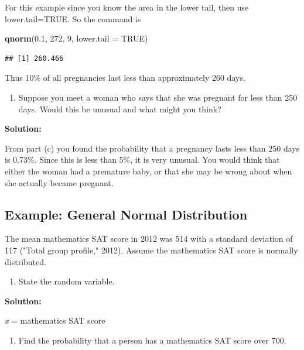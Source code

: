 \documentclass[
]{book}
\newenvironment{Shaded}{\begin{snugshade}}{\end{snugshade}}
\newcommand{\DataTypeTok}[1]{\textcolor[rgb]{0.13,0.29,0.53}{#1}}
\newcommand{\DecValTok}[1]{\textcolor[rgb]{0.00,0.00,0.81}{#1}}
\newcommand{\FloatTok}[1]{\textcolor[rgb]{0.00,0.00,0.81}{#1}}
\newcommand{\KeywordTok}[1]{\textcolor[rgb]{0.13,0.29,0.53}{\textbf{#1}}}
\newcommand{\NormalTok}[1]{#1}
\newcommand{\OtherTok}[1]{\textcolor[rgb]{0.56,0.35,0.01}{#1}}
\providecommand{\tightlist}{%
  \setlength{\itemsep}{0pt}\setlength{\parskip}{0pt}}
\begin{document}
For this example since you know the area in the lower tail, then use lower.tail=TRUE. So the command is

\begin{Shaded}
\begin{Highlighting}[]
\KeywordTok{qnorm}\NormalTok{(}\FloatTok{0.1}\NormalTok{, }\DecValTok{272}\NormalTok{, }\DecValTok{9}\NormalTok{, }\DataTypeTok{lower.tail =} \OtherTok{TRUE}\NormalTok{)}
\end{Highlighting}
\end{Shaded}

\begin{verbatim}
## [1] 260.466
\end{verbatim}

Thus 10\% of all pregnancies last less than approximately 260 days.

\begin{enumerate}
\def\labelenumi{\alph{enumi}.}
\setcounter{enumi}{5}
\tightlist
\item
  Suppose you meet a woman who says that she was pregnant for less than 250 days. Would this be unusual and what might you think?
\end{enumerate}

\textbf{Solution:}

From part (c) you found the probability that a pregnancy lasts less than 250 days is 0.73\%. Since this is less than 5\%, it is very unusual. You would think that either the woman had a premature baby, or that she may be wrong about when she actually became pregnant.

\hypertarget{example-general-normal-distribution-1}{%
\subsection{Example: General Normal Distribution}\label{example-general-normal-distribution-1}}

The mean mathematics SAT score in 2012 was 514 with a standard deviation of 117 ("Total group profile," 2012). Assume the mathematics SAT score is normally distributed.

\begin{enumerate}
\def\labelenumi{\alph{enumi}.}
\tightlist
\item
  State the random variable.
\end{enumerate}

\textbf{Solution:}

\emph{x} = mathematics SAT score

\begin{enumerate}
\def\labelenumi{\alph{enumi}.}
\setcounter{enumi}{1}
\tightlist
\item
  Find the probability that a person has a mathematics SAT score
  over 700.
\end{enumerate}
\end{document}
